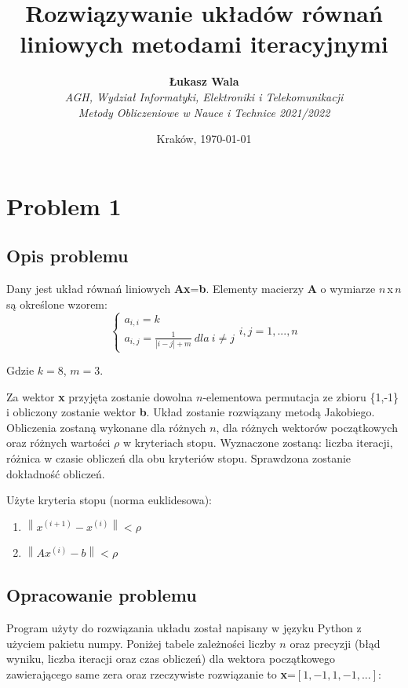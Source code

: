 \documentclass{article}
\title{Rozwiązywanie układów równań liniowych metodami iteracyjnymi}
\author{\textbf{Łukasz Wala}\\
    \textit{AGH, Wydział Informatyki, Elektroniki i Telekomunikacji} \\
    \textit{Metody Obliczeniowe w Nauce i Technice 2021/2022}}
\date{Kraków, \today}
\begin{document}
\maketitle

\section{Problem 1}
\subsection{Opis problemu}
Dany jest układ równań liniowych \textbf{Ax}=\textbf{b}.
Elementy macierzy \textbf{A} o wymiarze $n$\,x\,$n$ są określone wzorem:
$$
\begin{cases}
    a_{i,i}=k\\
    a_{i,j}=\frac{1}{|i-j|+m} \ dla \ i \ne j
\end{cases}i,j=1,...,n
$$

Gdzie $k=8$, $m=3$.

Za wektor \textbf{x} przyjęta zostanie dowolna $n$-elementowa permutacja ze zbioru \{1,-1\} i obliczony zostanie
wektor \textbf{b}. Układ zostanie rozwiązany metodą Jakobiego. Obliczenia zostaną wykonane dla różnych $n$,
dla różnych wektorów początkowych oraz różnych wartości $\rho$ w kryteriach stopu. Wyznaczone zostaną: liczba iteracji,
różnica w czasie obliczeń dla obu kryteriów stopu. Sprawdzona zostanie dokładność obliczeń.

Użyte kryteria stopu (norma euklidesowa):
\begin{enumerate}
    \item 
    $\left\|x^{(i+1)}-x^{(i)}\right\| < \rho$
    \item
    $\left\|Ax^{(i)}-b\right\| < \rho$
\end{enumerate}

\subsection{Opracowanie problemu}
Program użyty do rozwiązania układu został napisany w języku Python z użyciem pakietu numpy. Poniżej tabele zależności
liczby $n$ oraz precyzji (błąd wyniku, liczba iteracji oraz czas obliczeń) dla wektora początkowego zawierającego same
zera oraz rzeczywiste rozwiązanie to \textbf{x}\:=$[1,-1,1,-1,...]$:

\newpage
\thispagestyle{empty}
\end{document}
